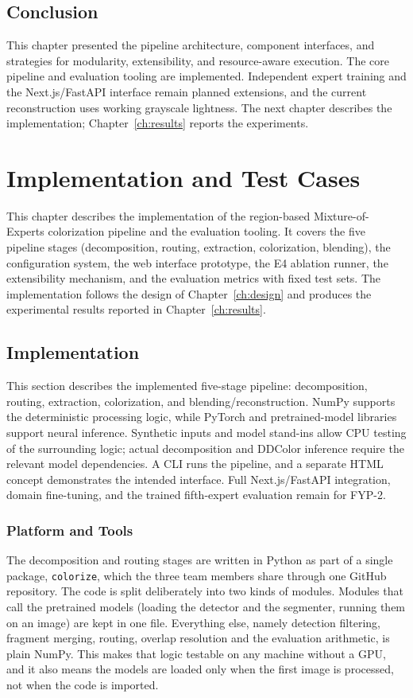 \documentclass{FastFyp}
\begin{document}
\section{Conclusion}

This chapter presented the pipeline architecture, component interfaces, and strategies for modularity, extensibility, and resource-aware execution. The core pipeline and evaluation tooling are implemented. Independent expert training and the Next.js/FastAPI interface remain planned extensions, and the current reconstruction uses working grayscale lightness. The next chapter describes the implementation; Chapter~\ref{ch:results} reports the experiments.



\chapter{Implementation and Test Cases}
\label{ch:implementation}
This chapter describes the implementation of the region-based Mixture-of-Experts colorization pipeline and the evaluation tooling. It covers the five pipeline stages (decomposition, routing, extraction, colorization, blending), the configuration system, the web interface prototype, the E4 ablation runner, the extensibility mechanism, and the evaluation metrics with fixed test sets. The implementation follows the design of Chapter~\ref{ch:design} and produces the experimental results reported in Chapter~\ref{ch:results}.

\section{Implementation}
This section describes the implemented five-stage pipeline: decomposition, routing, extraction, colorization, and blending/reconstruction. NumPy supports the deterministic processing logic, while PyTorch and pretrained-model libraries support neural inference. Synthetic inputs and model stand-ins allow CPU testing of the surrounding logic; actual decomposition and DDColor inference require the relevant model dependencies. A CLI runs the pipeline, and a separate HTML concept demonstrates the intended interface. Full Next.js/FastAPI integration, domain fine-tuning, and the trained fifth-expert evaluation remain for FYP-2.
\subsection{Platform and Tools}
The decomposition and routing stages are written in Python as part of a single package, \texttt{colorize}, which the three team members share through one GitHub repository. The code is split deliberately into two kinds of modules. Modules that call the pretrained models (loading the detector and the segmenter, running them on an image) are kept in one file. Everything else, namely detection filtering, fragment merging, routing, overlap resolution and the evaluation arithmetic, is plain NumPy. This makes that logic testable on any machine without a GPU, and it also means the models are loaded only when the first image is processed, not when the code is imported.
 
\end{document}
